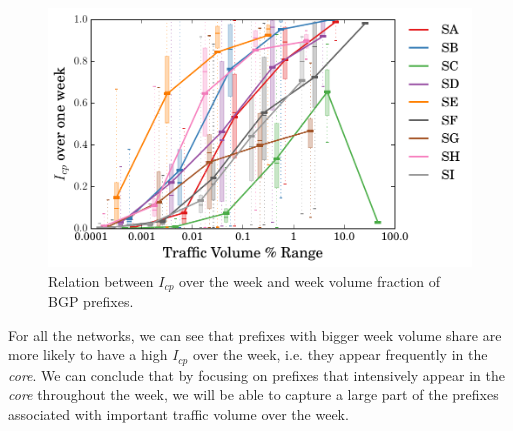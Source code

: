 \begin{figure}[!tb]
\centering
\includegraphics[width=1\textwidth]{gfx/chap2/cp_bin.pdf}
\caption{Relation between $I_{cp}$ over the week and week volume fraction of BGP prefixes.}
\label{fig:cpi}
\end{figure}

For all the networks, we can see that prefixes with bigger week volume share are more likely to have a high $I_{cp}$ over the week, i.e. they appear frequently in the \textit{core}.
We can conclude that by focusing on prefixes that intensively appear in the \textit{core} throughout the week, we will be able to capture a large part of the prefixes associated with important traffic volume over the week.

